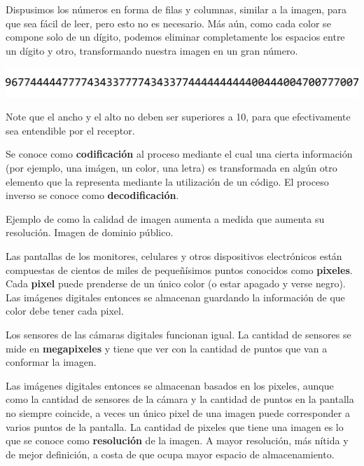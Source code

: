 Dispusimos los números en forma de filas y columnas, similar a la
imagen, para que sea fácil de leer, pero esto no es necesario. Más aún, como
cada color se compone solo de un dígito, podemos eliminar completamente los
espacios entre un dígito y otro, transformando nuestra imagen en un gran número.

\centerline{\includegraphics[]{capitulos/bajo_nivel/imagenes/pixels_car_numbers_final.png}}

Note que el ancho y el alto no deben ser superiores a 10, para que efectivamente
sea entendible por el receptor.

\begin{definition}
    Se conoce como \textbf{codificación} al proceso mediante el cual una cierta
    información (por ejemplo, una imágen, un color, una letra) es transformada
    en algún otro elemento que la representa mediante la utilización de un
    código. El proceso inverso se conoce como \textbf{decodificación}.
\end{definition}

{Ejemplo de como la calidad de imagen aumenta a medida que aumenta su resolución.}
{Imagen de dominio público.}

\begin{knowwhat}
Las pantallas de los monitores, celulares y otros dispositivos electrónicos
están compuestas de cientos de miles de pequeñísimos puntos conocidos como
\textbf{pixeles}. Cada \textbf{pixel} puede prenderse de un único color (o estar
apagado y verse negro). Las imágenes digitales entonces se almacenan guardando
la información de que color debe tener cada pixel.

Los sensores de las cámaras digitales funcionan igual. La cantidad de sensores
se mide en \textbf{megapixeles} y tiene que ver con la cantidad de puntos que
van a conformar la imagen.

Las imágenes digitales entonces se almacenan basados en los pixeles, aunque
como la cantidad de sensores de la cámara y la cantidad de puntos en la pantalla
no siempre coincide, a veces un único pixel de una imagen puede corresponder
a varios puntos de la pantalla. La cantidad de pixeles que tiene una imagen
es lo que se conoce como \textbf{resolución} de la imagen. A mayor resolución,
más nítida y de mejor definición, a costa de que ocupa mayor espacio de
almacenamiento.
\end{knowwhat}

